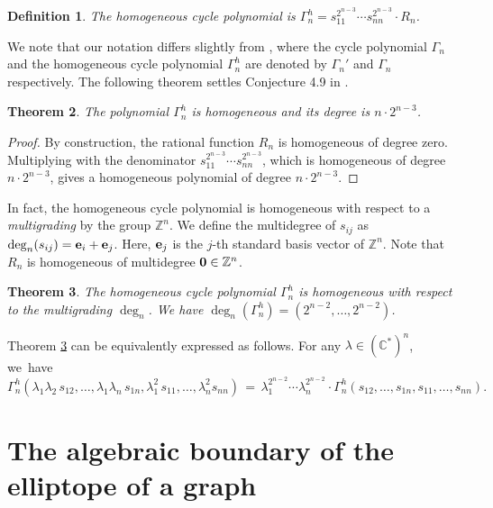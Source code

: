 \documentclass[a4paper, 11pt, twoside]{article}
\theoremstyle{plain}
\newtheorem{theorem}{Theorem}[section]
\newtheorem{definition}[theorem]{Definition}
\begin{document}
\begin{definition}\label{def:hGamma}
    The \emph{homogeneous cycle polynomial} is $\Gamma_n^h = s_{11}^{2^{n-3}} \cdots s_{nn}^{2^{n-3}} \cdot R_n$. 
\end{definition}

We note that our notation differs slightly from \cite{Sturmfels2010MultivariateGaussians}, where the cycle polynomial $\Gamma_n$ and the homogeneous cycle polynomial $\Gamma_n^h$ are denoted by $\Gamma_n'$ and $\Gamma_n$ respectively. 
The following theorem settles Conjecture 4.9 in \cite{Sturmfels2010MultivariateGaussians}. 

\begin{theorem} \label{thm:degGammah}
  The polynomial $\Gamma_n^h$  is homogeneous and its degree is  $n \cdot 2^{n-3}$.
\end{theorem}

\begin{proof}
    By construction, the rational function $R_n$ is homogeneous of degree zero. Multiplying with the denominator $s_{11}^{2^{n-3}} \cdots s_{nn}^{2^{n-3}}$, which is homogeneous of degree $n\cdot 2^{n-3}$,  gives a homogeneous polynomial of degree $n \cdot 2^{n-3}$. 
\end{proof}

In fact, the homogeneous cycle polynomial is homogeneous with respect to a \emph{multigrading} by the group $\mathbb{Z}^n$. We define the multidegree of $s_{ij}$ as $\deg_n(s_{ij}) = {\bf e}_i + {\bf e}_j$. Here, ${\bf e}_j$ is the $j$-th standard basis vector of $\mathbb{Z}^n$. Note that $R_n$ is homogeneous of multidegree ${\bf 0} \in \mathbb{Z}^n$.

\begin{theorem} \label{thm:multidegGammah}
    The homogeneous cycle polynomial $\Gamma^h_n$ is homogeneous with respect to the multigrading $\deg_n$. We have $\deg_n(\Gamma_n^h) = (2^{n-2}, \ldots, 2^{n-2})$. 
\end{theorem}

Theorem \ref{thm:multidegGammah} can be equivalently expressed as follows. For any $\lambda \in (\mathbb{C}^*)^n$, we~have 
\[ \Gamma_n^h(\lambda_1\lambda_2 \, s_{12}, \ldots, \lambda_1 \lambda_n \, s_{1n}, \lambda_1^2 \, s_{11}, \ldots, \lambda_n^2 s_{nn}) \, = \, \lambda_1^{2^{n-2}} \cdots \lambda_n^{2^{n-2}} \cdot \Gamma_n^h(s_{12}, \ldots, s_{1n}, s_{11}, \ldots, s_{nn}).\]

\section{The algebraic boundary of the elliptope of a graph}\label{sec:boundary}
\end{document}
